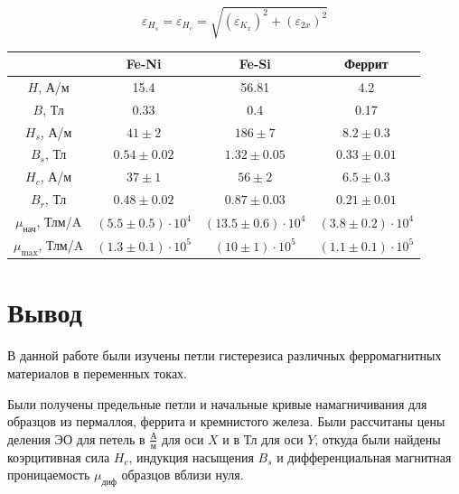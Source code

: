 \documentclass[12pt,a4paper]{article}
\begin{document}
\[
\varepsilon_{H_s} = \varepsilon_{H_c} = \sqrt{(\varepsilon_{K_x})^2 + (\varepsilon_{2x})^2 }
\]
\begin{table}[h]
    \centering
    \begin{tabular}{|c|c|c|c|}
    \hline
                       &Fe-Ni             & Fe-Si            & Феррит      \\ \hline
    $H$, А/м           & 15.4             & 56.81            & 4.2         \\ \hline
    $B$, Тл            & 0.33             & 0.4              & 0.17        \\ \hline
    $H_{s}$, А/м       & $41\pm 2$        & $186 \pm 7$      & $8.2\pm0.3$       \\ \hline
    $B_s$, Тл          & $0.54 \pm 0.02$  & $1.32 \pm 0.05$              & $0.33\pm 0.01$        \\ \hline
    $H_{c}$, А/м       & $37 \pm 1$        & $56 \pm 2$      & $6.5\pm 0.3$         \\ \hline
    $B_r$, Тл          &$0.48 \pm 0.02$         & $0.87 \pm 0.03$            & $0.21 \pm 0.01$        \\ \hline
    $\mu_{\text{нач}}$, Тлм/A &$(5.5 \pm 0.5) \cdot 10^4$          & $(13.5 \pm 0.6) \cdot 10^4$              & $(3.8\pm 0.2) \cdot 10^4$        \\ \hline
    $\mu_{\text{max}}$, Тлм/A &       $(1.3 \pm 0.1) \cdot 10^5$          & $(10 \pm 1) \cdot 10^5$              & $(1.1\pm 0.1) \cdot 10^5$        \\ \hline
    \end{tabular}
\end{table}
\section*{Вывод}

В данной работе были изучены петли гистерезиса различных ферромагнитных материалов в переменных токах.

Были получены предельные петли и начальные кривые намагничивания для образцов из пермаллоя, феррита и кремнистого железа.  Были рассчитаны цены деления ЭО для петель в $\frac{\text{А}}{\text{м}}$ для оси $X$ и в $\text{Тл}$ для оси $Y$, откуда были найдены коэрцитивная сила $H_c$, индукция насыщения $B_s$ и дифференциальная магнитная проницаемость $\mu_{\text{диф}}$ образцов вблизи нуля. 
\end{document}
